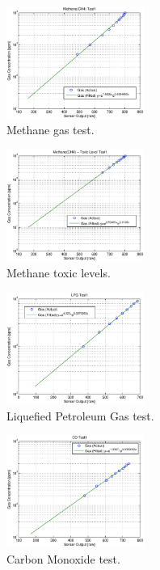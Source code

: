 \begin{figure}
	\centering
	\includegraphics[width=0.4\textwidth]{./matlab/MethaneTest1.eps}
	\caption{Methane gas test.}
	\label{fig:methanetest}
\end{figure}

\begin{figure}
	\centering
	\includegraphics[width=0.4\textwidth]{./matlab/MethaneToxic.eps}
	\caption{Methane toxic levels.}
	\label{fig:methanetoxic}
\end{figure}

\begin{figure}
	\centering
	\includegraphics[width=0.4\textwidth]{./matlab/LPG.eps}
	\caption{Liquefied Petroleum Gas test.}
	\label{fig:lpg}
\end{figure}

\begin{figure}
	\centering
	\includegraphics[width=0.4\textwidth]{./matlab/COTest1.eps}
	\caption{Carbon Monoxide test.}
	\label{fig:co}
\end{figure}

